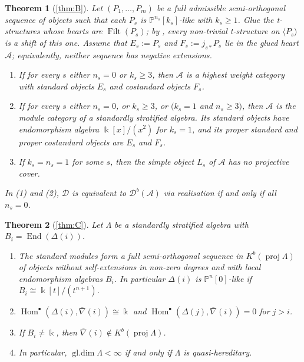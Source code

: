 \documentclass[11pt,reqno]{amsart}
\theoremstyle{plain}
\newtheorem{maintheorem}{Theorem}
\theoremstyle{definition}
\theoremstyle{remark}
\newcommand{\kk}{\Bbbk}
\DeclareMathOperator{\Hom}{Hom}
\DeclareMathOperator{\End}{End}
\DeclareMathOperator{\Filt}{Filt}
\DeclareMathOperator{\gldim}{gl.dim}
\newcommand{\proj}{\operatorname{proj}}
\newcommand{\Db}{\mathcal{D}^b}
\newcommand{\Kb}{K^b}
\newcommand{\thick}[1]{\langle #1\rangle}
\newcommand{\Pn}[2]{\mathbb{P}^{#1}[#2]}
\newcommand{\nablabar}{\overline{\nabla}}
\newcommand{\cD}{\mathcal{D}}
\newcommand{\cA}{\mathcal{A}}
\begin{document}
\begin{maintheorem}[\cref{thm:B}]\label{mthm:B}
Let $(P_1,\dots,P_m)$ be a full admissible semi-orthogonal sequence of objects such that each $P_s$ is $\Pn{n_s}{k_s}$-like with $k_s\ge1$. Glue the t-structures whose hearts are $\Filt(P_s)$; by \cite{Bonf26}, every non-trivial t-structure on $\thick{P_s}$ is a shift of this one. Assume that $E_s:=P_s$ and $F_s:=j_{s*}P_s$ lie in the glued heart $\cA$; equivalently, neither sequence has negative extensions.
\begin{enumerate}
\item If for every $s$ either $n_s=0$ or $k_s\ge 3$, then $\cA$ is a highest weight category with standard objects $E_s$ and costandard objects $F_s$.
\item If for every $s$ either $n_s=0$, or $k_s\ge 3$, or $(k_s=1$ and $n_s\geq 3)$, then $\cA$ is the module category of a standardly stratified algebra. Its standard objects have endomorphism algebra $\kk[x]/(x^2)$ for $k_s=1$, and its proper standard and proper costandard objects are $E_s$ and $F_s$.
\item If $k_s=n_s=1$ for some $s$, then the simple object $L_s$ of $\cA$ has no projective cover.
\end{enumerate}
In \textup{(1)} and \textup{(2)}, $\cD$ is equivalent to $\Db(\cA)$ via realisation if and only if all $n_s=0$.
\end{maintheorem}

\begin{maintheorem}[\cref{thm:C}]\label{mthm:C}
Let $\Lambda$ be a standardly stratified algebra with $B_i=\End(\Delta(i))$.
\begin{enumerate}
\item The standard modules form a full semi-orthogonal sequence in $\Kb(\proj\Lambda)$ of objects without self-extensions in non-zero degrees and with local endomorphism algebras $B_i$. In particular $\Delta(i)$ is $\Pn{n}{0}$-like if $B_i\cong\kk[t]/(t^{n+1})$.
\item $\Hom^\bullet(\Delta(i),\nablabar(i))\cong\kk$ and $\Hom^\bullet(\Delta(j),\nablabar(i))=0$ for $j>i$.
\item If $B_i\neq\kk$, then $\nablabar(i)\notin\Kb(\proj\Lambda)$.
\item In particular, $\gldim\Lambda<\infty$ if and only if $\Lambda$ is quasi-hereditary.
\end{enumerate}
\end{maintheorem}
\end{document}
